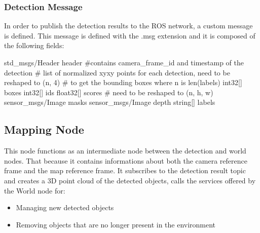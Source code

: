 \subsubsection[Detection Message]{Detection Message}
In order to publish the detection results to the ROS network, a custom message is defined.
This message is defined with the .msg extension and it is composed of the following fields:

\begin{python}
std_msgs/Header header #contains camera_frame_id and timestamp of the detection
# list of normalized xyxy points for each detection, need to be reshaped to (n, 4)
# to get the bounding boxes where n is len(labels)
int32[] boxes
int32[] ids
float32[] scores
# need to be reshaped to (n, h, w)
sensor_msgs/Image masks
sensor_msgs/Image depth
string[] labels
\end{python}

\subsection[Mapping Node]{Mapping Node}
This node functions as an intermediate node between the detection and world nodes. 
That because it contains informations about both the camera reference frame and the map reference frame.
It subscribes to the detection result topic and creates a 3D point cloud of the detected objects,
calls the services offered by the World node for:
\begin{itemize}
    \item Managing new detected objects
    \item Removing objects that are no longer present in the environment
\end{itemize}



